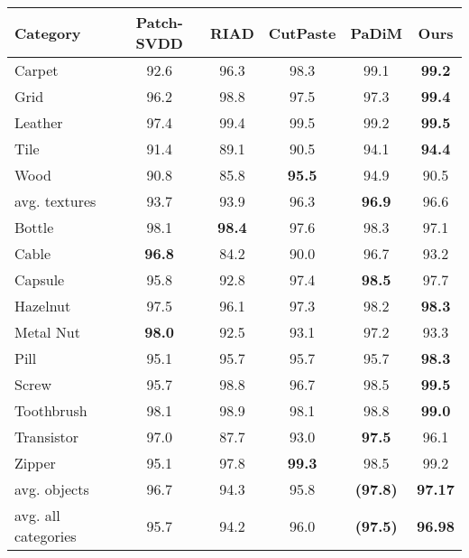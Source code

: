 \documentclass[final,5p,times,twocolumn]{elsarticle}
\begin{document}
	\begin{table*}[h]
		\begin{center}
			\begin{tabular}{|l c c c c c|} 
				\hline
				Category & Patch-SVDD \cite{Yi_2020_ACCV} & RIAD \cite{ZAVRTANIK2021107706} & CutPaste \cite{li2021cutpaste} &PaDiM \cite{defard2020padim} &Ours \\
				\hline \hline
				Carpet & 92.6 & 96.3 & 98.3 & 99.1 & \textbf{99.2} \\
				Grid & 96.2 & 98.8 & 97.5 & 97.3 &  \textbf{99.4} \\
				Leather& 97.4 & 99.4 & 99.5 & 99.2 & \textbf{99.5}  \\
				Tile & 91.4 & 89.1 & 90.5 &94.1  & \textbf{94.4} \\
				Wood & 90.8 & 85.8 & \textbf{95.5} & 94.9 & 90.5 \\
				\hline
				avg. textures & 93.7 & 93.9 & 96.3 & \textbf{96.9} & 96.6 \\
				\hline 
				Bottle & 98.1 & \textbf{98.4} & 97.6 & 98.3 & 97.1 \\
				Cable &\textbf{96.8}  & 84.2 &  90.0  & 96.7 & 93.2  \\
				Capsule & 95.8 & 92.8 & 97.4 & \textbf{98.5} & 97.7 \\
				Hazelnut & 97.5 & 96.1 & 97.3 & 98.2 & \textbf{98.3} \\
				Metal Nut & \textbf{98.0} & 92.5 & 93.1 & 97.2 & 93.3 \\
				Pill & 95.1 & 95.7 & 95.7 & 95.7 & \textbf{98.3}  \\
				Screw & 95.7 & 98.8 & 96.7 & 98.5 & \textbf{99.5}  \\
				Toothbrush & 98.1 & 98.9 & 98.1 & 98.8 & \textbf{99.0} \\
				Transistor& 97.0 & 87.7 & 93.0 & \textbf{97.5} & 96.1 \\
				Zipper & 95.1 & 97.8  & \textbf{99.3}  & 98.5 & 99.2 \\
				\hline
				avg. objects & 96.7 & 94.3 & 95.8& \textbf{(97.8)} & \textbf{97.17} \\
				\hline 
				avg. all categories & 95.7 & 94.2 & 96.0 & \textbf{(97.5)} & \textbf{96.98} \\
				\hline
			\end{tabular}
			\label{table:results_segmentation}
		\end{center}
	\end{table*}
	
\end{document}

